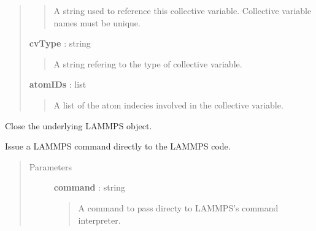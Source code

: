 \documentclass[letterpaper,10pt,english]{sphinxmanual}
\begin{document}
\begin{fulllineitems}
\begin{fulllineitems}
\begin{quote}
\begin{description}
\begin{quote}
A string used to reference this collective variable. Collective variable names must be unique.
\end{quote}

\textbf{cvType} : string
\begin{quote}

A string refering to the type of collective variable.
\end{quote}

\textbf{atomIDs} : list
\begin{quote}

A list of the atom indecies involved in the collective variable.
\end{quote}

\end{description}\end{quote}

\end{fulllineitems}


\begin{fulllineitems}
\label{walker_api/walker_api.doc:walker_api.lammps_walker.Lammps.close}
Close the underlying LAMMPS object.

\end{fulllineitems}


\begin{fulllineitems}
\label{walker_api/walker_api.doc:walker_api.lammps_walker.Lammps.command}
Issue a LAMMPS command directly to the LAMMPS code.
\begin{quote}\begin{description}
\item[{Parameters}] \leavevmode
\textbf{command} : string
\begin{quote}

A command to pass directy to LAMMPS's command interpreter.
\end{quote}

\end{description}\end{quote}

\end{fulllineitems}



\end{fulllineitems}
\end{document}
